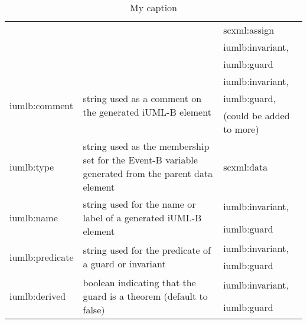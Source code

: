 \begin{table}[tbp]
{\begin{tabular}{|l|l|l|}
                                   &                                                                                                                            & scxml:assign             \\
                                   &                                                                                                                            & iumlb:invariant,         \\
                                   &                                                                                                                            & iumlb:guard              \\ \hline
\multirow{3}{*}{iumlb:comment}     & \multirow{3}{*}{string used as a comment on the generated iUML-B element}                                                  & iumlb:invariant,         \\
                                   &                                                                                                                            & iumlb:guard,             \\
                                   &                                                                                                                            & (could be added to more) \\ \hline
iumlb:type                         & string used as the membership set for the Event-B variable generated from the parent data element                          & scxml:data               \\ \hline
\multirow{2}{*}{iumlb:name}        & \multirow{2}{*}{string used for the name or label of a generated iUML-B element}                                           & iumlb:invariant,         \\
                                   &                                                                                                                            & iumlb:guard              \\ \hline
\multirow{2}{*}{iumlb:predicate}   & \multirow{2}{*}{string used for the predicate of a guard or invariant}                                                     & iumlb:invariant,         \\
                                   &                                                                                                                            & iumlb:guard              \\ \hline
\multirow{2}{*}{iumlb:derived}     & \multirow{2}{*}{boolean indicating that the guard is a theorem (default to false)}                                         & iumlb:invariant,         \\
                                   &                                                                                                                            & iumlb:guard              \\ \hline
\end{tabular}%
}
\caption{My caption}
\label{my-label}
\end{table}


